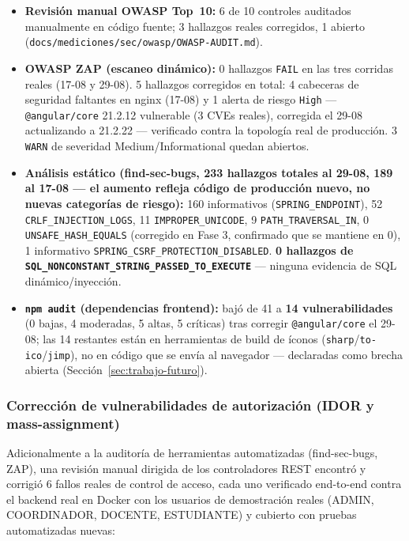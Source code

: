 \begin{itemize}[nosep]
    \item \textbf{Revisión manual OWASP Top~10:} 6 de 10 controles auditados manualmente en código
    fuente; 3 hallazgos reales corregidos, 1 abierto (\texttt{docs/mediciones/sec/owasp/OWASP-AUDIT.md}).
    \item \textbf{OWASP ZAP (escaneo dinámico):} 0 hallazgos \texttt{FAIL} en las tres corridas reales
    (17-08 y 29-08). 5 hallazgos corregidos en total: 4 cabeceras de seguridad faltantes en nginx
    (17-08) y 1 alerta de riesgo \texttt{High} --- \texttt{@angular/core} 21.2.12 vulnerable (3 CVEs
    reales), corregida el 29-08 actualizando a 21.2.22 --- verificado contra la topología real de
    producción. 3 \texttt{WARN} de severidad Medium/Informational quedan abiertos.
    \item \textbf{Análisis estático (find-sec-bugs, 233 hallazgos totales al 29-08, 189 al 17-08 ---
    el aumento refleja código de producción nuevo, no nuevas categorías de riesgo):} 160 informativos
    (\texttt{SPRING\_ENDPOINT}), 52 \texttt{CRLF\_INJECTION\_LOGS}, 11 \texttt{IMPROPER\_UNICODE}, 9
    \texttt{PATH\_TRAVERSAL\_IN}, 0 \texttt{UNSAFE\_HASH\_EQUALS} (corregido en Fase 3, confirmado que se
    mantiene en 0), 1 informativo \texttt{SPRING\_CSRF\_PROTECTION\_DISABLED}.
    \textbf{0 hallazgos de \texttt{SQL\_NONCONSTANT\_STRING\_PASSED\_TO\_EXECUTE}} --- ninguna evidencia
    de SQL dinámico/inyección.
    \item \textbf{\texttt{npm audit} (dependencias frontend):} bajó de 41 a \textbf{14 vulnerabilidades}
    (0 bajas, 4 moderadas, 5 altas, 5 críticas) tras corregir \texttt{@angular/core} el 29-08; las 14
    restantes están en herramientas de build de íconos (\texttt{sharp}/\texttt{to-ico}/\texttt{jimp}),
    no en código que se envía al navegador --- declaradas como brecha abierta
    (Sección~\ref{sec:trabajo-futuro}).
\end{itemize}

\subsubsection{Corrección de vulnerabilidades de autorización (IDOR y mass-assignment)}
\label{sec:seguridad-corregida}

Adicionalmente a la auditoría de herramientas automatizadas (find-sec-bugs, ZAP), una revisión manual
dirigida de los controladores REST encontró y corrigió 6 fallos reales de control de acceso, cada uno
verificado end-to-end contra el backend real en Docker con los usuarios de demostración reales (ADMIN,
COORDINADOR, DOCENTE, ESTUDIANTE) y cubierto con pruebas automatizadas nuevas:

